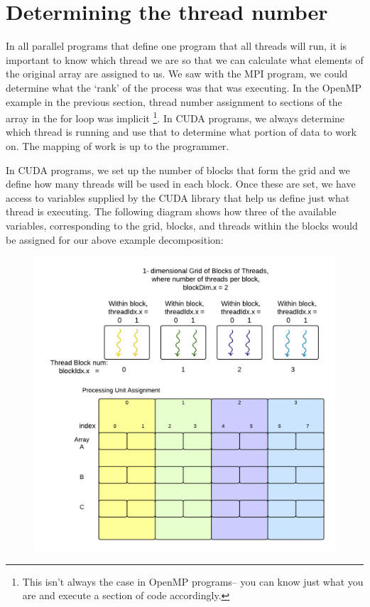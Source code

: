 \documentclass[letterpaper,10pt,openany,oneside]{sphinxmanual}
\begin{document}
\section{Determining the thread number}
\label{Decomposition/CUDA_VecAdd:determining-the-thread-number}
In all parallel programs that define one program that all threads will run, it is important to know which thread we are so that we can calculate what elements of the original array are assigned to us.  We saw with the MPI program, we could determine what the `rank' of the process was that was executing.  In the OpenMP example in the previous section, thread number assignment to sections of the array in the for loop was implicit \footnote{
This isn't always the case in OpenMP programs-- you can know just what you are and execute a section of code accordingly.
}.
In CUDA programs, we always determine which thread is running and use that to determine what portion of data to work on. The mapping of work is up to the programmer.

In CUDA programs, we set up the number of blocks that form the grid and we define how many threads will be used in each block. Once these are set, we have access to variables supplied by the CUDA library that help us define just what thread is executing. The following diagram shows how three of the available variables, corresponding to the grid, blocks, and threads within the blocks would be assigned for our above example decomposition:
\begin{figure}[htbp]
\centering

\includegraphics{CUDABThreadNumCalc.png}
\end{figure}
\end{document}
